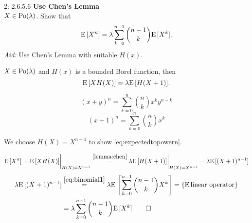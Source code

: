 \documentclass[a4paper,twoside=false,abstract=false,numbers=noenddot,
titlepage=false,headings=small,parskip=half,version=last]{scrartcl}
\begin{document}

\begin{exercise}{2: 2.6.5.6} \textbf{Use Chen's Lemma} \\
    $X \in \text{Po}(\lambda)$. Show that
    \begin{equation}
        \label{eq:expectedtopowern}
        {\rm E}\,[X^n] =
        \lambda \sum\limits_{k=0}^{n-1} \binom{n-1}{k}{\rm E}\,[X^k].
    \end{equation}
    \textit{Aid:} Use Chen's Lemma with suitable $H(x)$.
\end{exercise}
\begin{solution}
    \begin{lemma}
        \label{lemma:chen}  %
        $X \in \text{Po}(\lambda)$ and $H(x)$ is a bounded
        Borel function, then
        \begin{equation}
            \label{eq:chen}
            {\rm E}\,[XH(X)] = \lambda{\rm E}\,[H(X+1)].
        \end{equation}
    \end{lemma}
    \begin{identity}
        \label{id:binomial}
        \begin{equation}
            \label{eq:binomial}
            (x+y)^n = \sum\limits_{k=0}^n \binom{n}{k} x^ky^{n-k}
        \end{equation}
        \begin{equation}
            \label{eq:binomial1}
            (x+1)^n = \sum\limits_{k=0}^n \binom{n}{k} x^k
        \end{equation}
    \end{identity}

    We choose $H(X) = X^{n-1}$ to show \eqref{eq:expectedtopowern}.

    \begin{equation}
        {\rm E}\,[X^n] = {{\rm E}\,[XH(X)]}\bigg|_{H(X)=X^{n-1}}
        \stackrel{\eqref{lemma:chen}}{=}
        \lambda {{\rm E}\,[H(X+1)]}\bigg|_{H(X)=X^{n-1}} =
        \lambda {\rm E}\,[(X+1)^{n-1}]
    \end{equation}
    \begin{align}
        \lambda {\rm E}\,[(X+1)^{n-1}] & \stackrel{\eqref{eq:binomial1}}{=}
        \lambda {\rm E}\,
            \left[
                \sum\limits_{k=0}^{n-1} \binom{n-1}{k}X^k
            \right] =
        \left\{{\rm E}\, \text{linear operator}\right\} \nonumber \\ & =
        \lambda\sum\limits_{k=0}^{n-1} \binom{n-1}{k}{\rm E}\,[X^k] \qed
    \end{align}
\end{solution}
\end{document}
